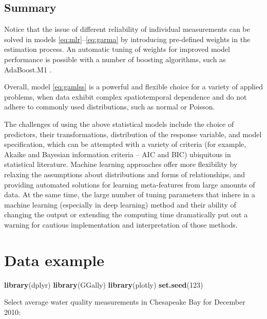\documentclass[
]{book}
\newenvironment{Shaded}{\begin{snugshade}}{\end{snugshade}}
\newcommand{\DecValTok}[1]{\textcolor[rgb]{0.00,0.00,0.81}{#1}}
\newcommand{\KeywordTok}[1]{\textcolor[rgb]{0.13,0.29,0.53}{\textbf{#1}}}
\newcommand{\NormalTok}[1]{#1}
\begin{document}
\hypertarget{summary}{%
\subsection{Summary}\label{summary}}

Notice that the issue of different reliability of individual measurements can be solved in models \eqref{eq:mlr}--\eqref{eq:garma} by introducing pre-defined weights in the estimation process. An automatic tuning of weights for improved model performance is possible with a number of boosting algorithms, such as AdaBoost.M1 \citep{Hastie:etal:2009}.

Overall, model \eqref{eq:gamlss} is a powerful and flexible choice for a variety of applied problems, when data exhibit complex spatiotemporal dependence and do not adhere to commonly used distributions, such as normal or Poisson.

The challenges of using the above statistical models include the choice of predictors, their transformations, distribution of the response variable, and model specification, which can be attempted with a variety of criteria (for example, Akaike and Bayesian information criteria -- AIC and BIC) ubiquitous in statistical literature. Machine learning approaches offer more flexibility by relaxing the assumptions about distributions and forms of relationships, and providing automated solutions for learning meta-features from large amounts of data. At the same time, the large number of tuning parameters that inhere in a machine learning (especially in deep learning) method and their ability of changing the output or extending the computing time dramatically put out a warning for cautious implementation and interpretation of those methods.

\hypertarget{data-example}{%
\section{Data example}\label{data-example}}

\begin{Shaded}
\begin{Highlighting}[]
\KeywordTok{library}\NormalTok{(dplyr)}
\KeywordTok{library}\NormalTok{(GGally)}
\KeywordTok{library}\NormalTok{(plotly)}
\KeywordTok{set.seed}\NormalTok{(}\DecValTok{123}\NormalTok{)}
\end{Highlighting}
\end{Shaded}

Select average water quality measurements in Chesapeake Bay for December 2010:
\end{document}
